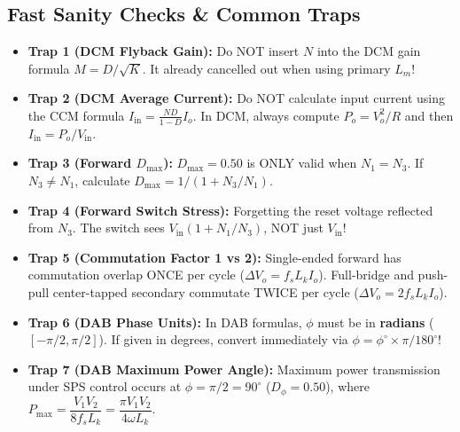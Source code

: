 \subsection{Fast Sanity Checks \& Common Traps}
\begin{itemize}
  \item \textbf{Trap 1 (DCM Flyback Gain):} Do NOT insert $N$ into the DCM gain formula $M = D/\sqrt{K}$. It already cancelled out when using primary $L_m$!
  \item \textbf{Trap 2 (DCM Average Current):} Do NOT calculate input current using the CCM formula $I_{\mathrm{in}} = \frac{ND}{1-D} I_o$. In DCM, always compute $P_o = V_o^2/R$ and then $I_{\mathrm{in}} = P_o / V_{\mathrm{in}}$.
  \item \textbf{Trap 3 (Forward $D_{\max}$):} $D_{\max} = 0.50$ is ONLY valid when $N_1 = N_3$. If $N_3 \neq N_1$, calculate $D_{\max} = 1 / (1 + N_3/N_1)$.
  \item \textbf{Trap 4 (Forward Switch Stress):} Forgetting the reset voltage reflected from $N_3$. The switch sees $V_{\mathrm{in}}(1 + N_1/N_3)$, NOT just $V_{\mathrm{in}}$!
  \item \textbf{Trap 5 (Commutation Factor 1 vs 2):} Single-ended forward has commutation overlap ONCE per cycle ($\Delta V_o = f_s L_k I_o$). Full-bridge and push-pull center-tapped secondary commutate TWICE per cycle ($\Delta V_o = 2 f_s L_k I_o$).
  \item \textbf{Trap 6 (DAB Phase Units):} In DAB formulas, $\phi$ must be in \textbf{radians} ($[-\pi/2, \pi/2]$). If given in degrees, convert immediately via $\phi = \phi^\circ \times \pi / 180^\circ$!
  \item \textbf{Trap 7 (DAB Maximum Power Angle):} Maximum power transmission under SPS control occurs at $\phi = \pi/2 = 90^\circ$ ($D_\phi = 0.50$), where $P_{\max} = \dfrac{V_1 V_2}{8 f_s L_k} = \dfrac{\pi V_1 V_2}{4 \omega L_k}$.
\end{itemize}
